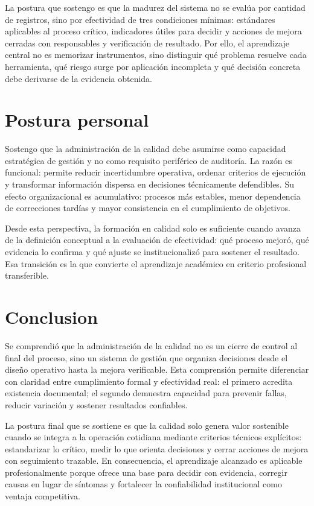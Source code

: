 \documentclass[
	spanish,
	letterpaper, oneside
]{article}
\begin{document}
La postura que sostengo es que la madurez del sistema no se evalúa por cantidad de registros, sino por efectividad de tres condiciones mínimas: estándares aplicables al proceso crítico, indicadores útiles para decidir y acciones de mejora cerradas con responsables y verificación de resultado. Por ello, el aprendizaje central no es memorizar instrumentos, sino distinguir qué problema resuelve cada herramienta, qué riesgo surge por aplicación incompleta y qué decisión concreta debe derivarse de la evidencia obtenida.

\section{Postura personal}

Sostengo que la administración de la calidad debe asumirse como capacidad estratégica de gestión y no como requisito periférico de auditoría. La razón es funcional: permite reducir incertidumbre operativa, ordenar criterios de ejecución y transformar información dispersa en decisiones técnicamente defendibles. Su efecto organizacional es acumulativo: procesos más estables, menor dependencia de correcciones tardías y mayor consistencia en el cumplimiento de objetivos.

Desde esta perspectiva, la formación en calidad solo es suficiente cuando avanza de la definición conceptual a la evaluación de efectividad: qué proceso mejoró, qué evidencia lo confirma y qué ajuste se institucionalizó para sostener el resultado. Esa transición es la que convierte el aprendizaje académico en criterio profesional transferible.

\section{Conclusion}

Se comprendió que la administración de la calidad no es un cierre de control al final del proceso, sino un sistema de gestión que organiza decisiones desde el diseño operativo hasta la mejora verificable. Esta comprensión permite diferenciar con claridad entre cumplimiento formal y efectividad real: el primero acredita existencia documental; el segundo demuestra capacidad para prevenir fallas, reducir variación y sostener resultados confiables.

La postura final que se sostiene es que la calidad solo genera valor sostenible cuando se integra a la operación cotidiana mediante criterios técnicos explícitos: estandarizar lo crítico, medir lo que orienta decisiones y cerrar acciones de mejora con seguimiento trazable. En consecuencia, el aprendizaje alcanzado es aplicable profesionalmente porque ofrece una base para decidir con evidencia, corregir causas en lugar de síntomas y fortalecer la confiabilidad institucional como ventaja competitiva.



\end{document}
